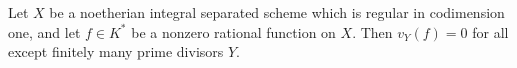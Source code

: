 Let $X$ be a noetherian integral separated scheme which is regular in codimension one, and let $f \in K^*$ be a nonzero rational function on $X$. Then $v_Y(f) = 0$ for all except finitely many prime divisors $Y$.
